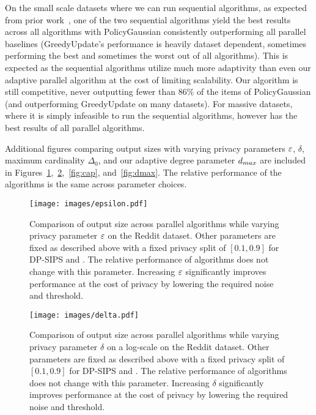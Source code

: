 On the small scale datasets where we can run sequential algorithms, as expected from prior work~\cite{swanberg2023dpsips}, one of the two sequential algorithms yield the best results across all algorithms with PolicyGaussian consistently outperforming all parallel baselines (GreedyUpdate's performance is heavily dataset dependent, sometimes performing the best and sometimes the worst out of all algorithms).  This is expected as the sequential algorithms utilize much more adaptivity than even our adaptive parallel algorithm at the cost of limiting scalability. Our algorithm is still competitive, never outputting fewer than $86\%$ of the items of PolicyGaussian (and outperforming GreedyUpdate on many datasets). 
For massive datasets, where it is simply infeasible to run the sequential algorithms, however \ouralgotworounds{} has the best results of all parallel algorithms.

Additional figures comparing output sizes with varying privacy parameters $\varepsilon$, $\delta$, maximum cardinality $\Delta_0$, and our adaptive degree parameter $d_{max}$ are included in Figures~\ref{fig:eps},~\ref{fig:delta},~\ref{fig:cap}, and~\ref{fig:dmax}. The relative performance of the algorithms is the same across parameter choices.


\begin{figure}[t]
    \centering
    \texttt{[image: images/epsilon.pdf]}
    \caption{Comparison of output size across parallel algorithms while varying privacy parameter $\varepsilon$ on the Reddit dataset. Other parameters are fixed as described above with a fixed privacy split of $[0.1,0.9]$ for DP-SIPS and \ouralgotworounds{}. The relative performance of algorithms does not change with this parameter. Increasing $\varepsilon$ significantly improves performance at the cost of privacy by lowering the required noise and threshold.}
    \label{fig:eps}
\end{figure}

\begin{figure}[t]
    \centering
    \texttt{[image: images/delta.pdf]}
    \caption{Comparison of output size across parallel algorithms while varying privacy parameter $\delta$ on a log-scale on the Reddit dataset. Other parameters are fixed as described above with a fixed privacy split of $[0.1,0.9]$ for DP-SIPS and \ouralgotworounds{}. The relative performance of algorithms does not change with this parameter. Increasing $\delta$ significantly improves performance at the cost of privacy by lowering the required noise and threshold.}
    \label{fig:delta}
\end{figure}

